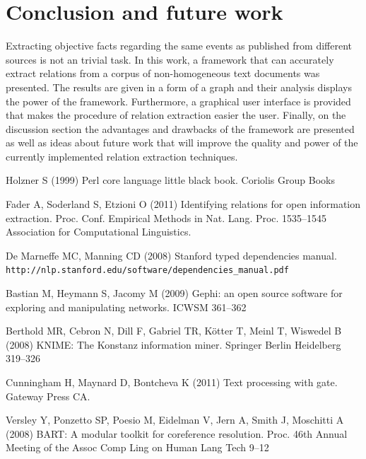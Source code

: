 \documentclass[]{article}
\begin{document}
\section{Conclusion and future work}
%
Extracting objective facts regarding the same events as published from different sources is not an trivial task. In this work, a framework that can accurately extract relations from a corpus of non-homogeneous text documents was presented. The results are given in a form of a graph and their analysis displays the power of the framework. Furthermore, a graphical user interface is provided that makes  the procedure of relation extraction easier the user. Finally, on the discussion section the advantages and drawbacks of the framework are presented as well as ideas about future work that will improve the quality and power of the currently implemented relation extraction techniques.
%
%
\begin{thebibliography}{99}
%

Holzner S (1999)
Perl core language little black book. 
Coriolis Group Books

Fader A, Soderland S, Etzioni O (2011) 
Identifying relations for open information extraction. 
Proc. Conf. Empirical Methods in Nat. Lang. Proc. 1535--1545
Association for Computational Linguistics.

De Marneffe MC, Manning CD (2008)
Stanford typed dependencies manual. \texttt{http://nlp.stanford.edu/software/dependencies\_manual.pdf}

Bastian M, Heymann S, Jacomy M (2009)
Gephi: an open source software for exploring and manipulating networks.
ICWSM 361--362

Berthold MR, Cebron N, Dill F, Gabriel TR, Kötter T, Meinl T, Wiswedel B (2008)
KNIME: The Konstanz information miner.
Springer Berlin Heidelberg 319--326

Cunningham H, Maynard D, Bontcheva K (2011)
Text processing with gate.
Gateway Press CA.

Versley Y, Ponzetto SP, Poesio M, Eidelman V, Jern A, Smith J, Moschitti A (2008)
BART: A modular toolkit for coreference resolution.
Proc. 46th Annual Meeting of the Assoc Comp Ling on Human Lang Tech 9--12

\end{thebibliography}
\end{document}
